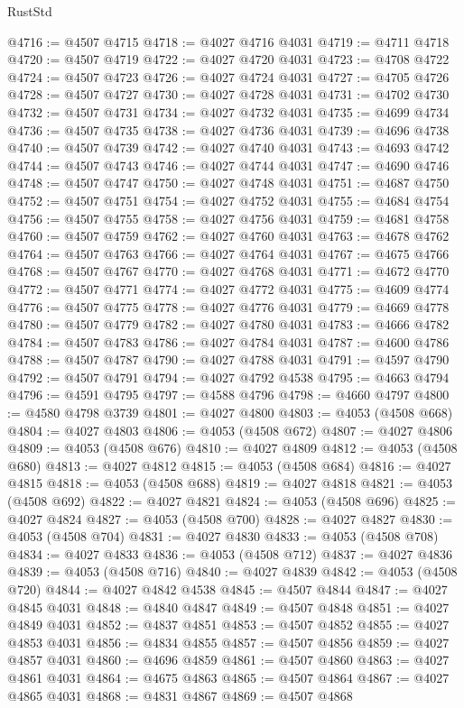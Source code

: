 \begin{lexlean}{RustStd}
\begin{coremodule}
@4716 := @4507 @4715
@4718 := @4027 @4716 @4031
@4719 := @4711 @4718
@4720 := @4507 @4719
@4722 := @4027 @4720 @4031
@4723 := @4708 @4722
@4724 := @4507 @4723
@4726 := @4027 @4724 @4031
@4727 := @4705 @4726
@4728 := @4507 @4727
@4730 := @4027 @4728 @4031
@4731 := @4702 @4730
@4732 := @4507 @4731
@4734 := @4027 @4732 @4031
@4735 := @4699 @4734
@4736 := @4507 @4735
@4738 := @4027 @4736 @4031
@4739 := @4696 @4738
@4740 := @4507 @4739
@4742 := @4027 @4740 @4031
@4743 := @4693 @4742
@4744 := @4507 @4743
@4746 := @4027 @4744 @4031
@4747 := @4690 @4746
@4748 := @4507 @4747
@4750 := @4027 @4748 @4031
@4751 := @4687 @4750
@4752 := @4507 @4751
@4754 := @4027 @4752 @4031
@4755 := @4684 @4754
@4756 := @4507 @4755
@4758 := @4027 @4756 @4031
@4759 := @4681 @4758
@4760 := @4507 @4759
@4762 := @4027 @4760 @4031
@4763 := @4678 @4762
@4764 := @4507 @4763
@4766 := @4027 @4764 @4031
@4767 := @4675 @4766
@4768 := @4507 @4767
@4770 := @4027 @4768 @4031
@4771 := @4672 @4770
@4772 := @4507 @4771
@4774 := @4027 @4772 @4031
@4775 := @4609 @4774
@4776 := @4507 @4775
@4778 := @4027 @4776 @4031
@4779 := @4669 @4778
@4780 := @4507 @4779
@4782 := @4027 @4780 @4031
@4783 := @4666 @4782
@4784 := @4507 @4783
@4786 := @4027 @4784 @4031
@4787 := @4600 @4786
@4788 := @4507 @4787
@4790 := @4027 @4788 @4031
@4791 := @4597 @4790
@4792 := @4507 @4791
@4794 := @4027 @4792 @4538
@4795 := @4663 @4794
@4796 := @4591 @4795
@4797 := @4588 @4796
@4798 := @4660 @4797
@4800 := @4580 @4798 @3739
@4801 := @4027 @4800
@4803 := @4053 (@4508 @668)
@4804 := @4027 @4803
@4806 := @4053 (@4508 @672)
@4807 := @4027 @4806
@4809 := @4053 (@4508 @676)
@4810 := @4027 @4809
@4812 := @4053 (@4508 @680)
@4813 := @4027 @4812
@4815 := @4053 (@4508 @684)
@4816 := @4027 @4815
@4818 := @4053 (@4508 @688)
@4819 := @4027 @4818
@4821 := @4053 (@4508 @692)
@4822 := @4027 @4821
@4824 := @4053 (@4508 @696)
@4825 := @4027 @4824
@4827 := @4053 (@4508 @700)
@4828 := @4027 @4827
@4830 := @4053 (@4508 @704)
@4831 := @4027 @4830
@4833 := @4053 (@4508 @708)
@4834 := @4027 @4833
@4836 := @4053 (@4508 @712)
@4837 := @4027 @4836
@4839 := @4053 (@4508 @716)
@4840 := @4027 @4839
@4842 := @4053 (@4508 @720)
@4844 := @4027 @4842 @4538
@4845 := @4507 @4844
@4847 := @4027 @4845 @4031
@4848 := @4840 @4847
@4849 := @4507 @4848
@4851 := @4027 @4849 @4031
@4852 := @4837 @4851
@4853 := @4507 @4852
@4855 := @4027 @4853 @4031
@4856 := @4834 @4855
@4857 := @4507 @4856
@4859 := @4027 @4857 @4031
@4860 := @4696 @4859
@4861 := @4507 @4860
@4863 := @4027 @4861 @4031
@4864 := @4675 @4863
@4865 := @4507 @4864
@4867 := @4027 @4865 @4031
@4868 := @4831 @4867
@4869 := @4507 @4868

\end{coremodule}
\end{lexlean}
